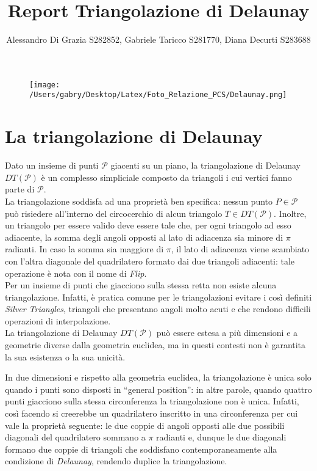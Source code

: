 \documentclass{article}
\title{Report Triangolazione di Delaunay}
\author{Alessandro Di Grazia S282852,  Gabriele Taricco S281770, Diana Decurti S283688}
\date{}
\begin{document}
\begin{figure}
	\centering
	\texttt{[image: /Users/gabry/Desktop/Latex/Foto\_Relazione\_PCS/Delaunay.png]}

\end{figure}
\maketitle
\newpage
\tableofcontents

\newpage
\section{La triangolazione di Delaunay}
Dato un insieme di punti $\mathcal{P}$ giacenti su un piano,  la triangolazione di Delaunay $DT(\mathcal{P})$ è un complesso simpliciale composto da triangoli i cui vertici fanno parte di $\mathcal{P}$.  \\
La triangolazione soddisfa ad una proprietà ben specifica: nessun punto $P \in \mathcal{P}$ può risiedere all'interno del circocerchio di alcun triangolo $T \in DT(\mathcal{P})$.  Inoltre,  un triangolo per essere valido deve essere tale che,  per ogni triangolo ad esso adiacente,  la somma degli angoli opposti al lato di adiacenza sia minore di $\pi$ radianti.  In caso la somma sia maggiore di $\pi$,  il lato di adiacenza viene scambiato con l'altra diagonale del quadrilatero formato dai due triangoli adiacenti: tale operazione è nota con il nome di \emph{Flip}.\\
\indent Per un insieme di punti che giacciono sulla stessa retta non esiste alcuna triangolazione.  Infatti,  è pratica comune per le triangolazioni evitare i così definiti \emph{Silver Triangles},  triangoli che presentano angoli molto acuti e che rendono difficili operazioni di interpolazione. \\
La triangolazione di Delaunay $DT(\mathcal{P})$ può essere estesa a più dimensioni e a geometrie diverse dalla geometria euclidea,  ma in questi contesti non è garantita la sua esistenza o la sua unicità.

In due dimensioni e rispetto alla geometria euclidea,  la triangolazione è unica solo quando i punti sono disposti in \enquote{general position}: in altre parole,  quando quattro punti giacciono sulla stessa circonferenza la triangolazione non è unica.  Infatti,  così facendo si creerebbe un quadrilatero inscritto in una circonferenza per cui vale la proprietà seguente: le due coppie di angoli opposti alle due possibili diagonali del quadrilatero sommano a $\pi$ radianti e,  dunque le due diagonali formano due coppie di triangoli che soddisfano contemporaneamente alla condizione di \emph{Delaunay},  rendendo duplice la triangolazione.
\end{document}
